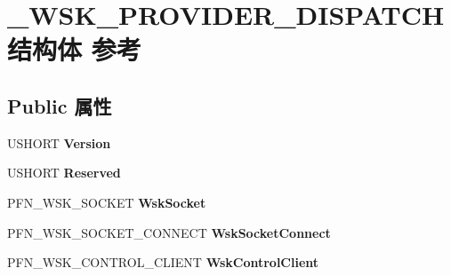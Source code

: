 \hypertarget{struct___w_s_k___p_r_o_v_i_d_e_r___d_i_s_p_a_t_c_h}{}\section{\+\_\+\+W\+S\+K\+\_\+\+P\+R\+O\+V\+I\+D\+E\+R\+\_\+\+D\+I\+S\+P\+A\+T\+C\+H结构体 参考}
\label{struct___w_s_k___p_r_o_v_i_d_e_r___d_i_s_p_a_t_c_h}
\subsection*{Public 属性}
\begin{DoxyCompactItemize}
\item 
\mbox{\label{struct___w_s_k___p_r_o_v_i_d_e_r___d_i_s_p_a_t_c_h_acfb9c35e9f52175dd924d91089e47d9b}} 
U\+S\+H\+O\+RT {\bfseries Version}
\item 
\mbox{\label{struct___w_s_k___p_r_o_v_i_d_e_r___d_i_s_p_a_t_c_h_a8b232c44b59b15ead3743ffc30059172}} 
U\+S\+H\+O\+RT {\bfseries Reserved}
\item 
\mbox{\label{struct___w_s_k___p_r_o_v_i_d_e_r___d_i_s_p_a_t_c_h_afe086dcc1530212676e851bc077d1bd7}} 
P\+F\+N\+\_\+\+W\+S\+K\+\_\+\+S\+O\+C\+K\+ET {\bfseries Wsk\+Socket}
\item 
\mbox{\label{struct___w_s_k___p_r_o_v_i_d_e_r___d_i_s_p_a_t_c_h_ac341f40340ff0b8197dc6bcd0093c53d}} 
P\+F\+N\+\_\+\+W\+S\+K\+\_\+\+S\+O\+C\+K\+E\+T\+\_\+\+C\+O\+N\+N\+E\+CT {\bfseries Wsk\+Socket\+Connect}
\item 
\mbox{\label{struct___w_s_k___p_r_o_v_i_d_e_r___d_i_s_p_a_t_c_h_a6ea1848553d7fbaa90e5b9fa5ad43481}} 
P\+F\+N\+\_\+\+W\+S\+K\+\_\+\+C\+O\+N\+T\+R\+O\+L\+\_\+\+C\+L\+I\+E\+NT {\bfseries Wsk\+Control\+Client}
\item 
\mbox{\label{struct___w_s_k___p_r_o_v_i_d_e_r___d_i_s_p_a_t_c_h_a062409a1c40aed42f259563862c45ade}} 

\end{DoxyCompactItemize}
